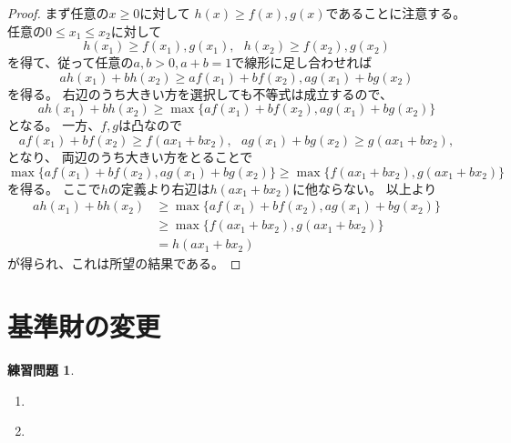 \documentclass[uplatex]{jsarticle}
\theoremstyle{definition}
\newtheorem{prob}[prob]{練習問題}
\begin{document}
\begin{proof}
  まず任意の\(x\geq 0\)に対して
  \(h(x) \geq f(x),g(x)\)であることに注意する。
  任意の\(0\leq x_1\leq x_2\)に対して
  \[
  h(x_1) \geq f(x_1),g(x_1), \ \ \ h(x_2) \geq f(x_2),g(x_2)
  \]
  を得て、従って任意の\(a,b > 0, a+b=1\)で線形に足し合わせれば
  \[
  ah(x_1)+bh(x_2) \geq af(x_1)+bf(x_2) , ag(x_1)+bg(x_2)
  \]
  を得る。
  右辺のうち大きい方を選択しても不等式は成立するので、
  \[
  ah(x_1)+bh(x_2) \geq \max\{ af(x_1)+bf(x_2) , ag(x_1)+bg(x_2) \}
  \]
  となる。
  一方、\(f,g\)は凸なので
  \[
  af(x_1)+bf(x_2) \geq f(ax_1+bx_2), \ \ \
  ag(x_1)+bg(x_2) \geq g(ax_1+bx_2),
  \]
  となり、
  両辺のうち大きい方をとることで
  \[
  \max\{ af(x_1)+bf(x_2) , ag(x_1)+bg(x_2) \}
  \geq \max\{ f(ax_1+bx_2),g(ax_1+bx_2) \}
  \]
  を得る。
  ここで\(h\)の定義より右辺は\(h(ax_1+bx_2)\)に他ならない。
  以上より
  \begin{align*}
    ah(x_1)+bh(x_2)
    &\geq \max\{ af(x_1)+bf(x_2) , ag(x_1)+bg(x_2) \} \\
    &\geq \max\{ f(ax_1+bx_2),g(ax_1+bx_2) \} \\
    &= h(ax_1+bx_2)
  \end{align*}
  が得られ、これは所望の結果である。
\end{proof}













\newpage

\section{基準財の変更}\label{section: 9}




\begin{prob}\label{prob: 9.1}
  \begin{enumerate}
    \item \label{enumi: 9.1-1}
    \item \label{enumi: 9.1-2}
  \end{enumerate}
\end{prob}
\end{document}
